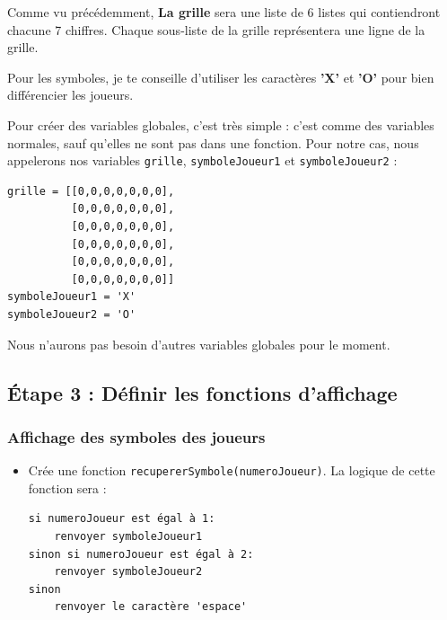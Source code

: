 \documentclass[11pt]{article}
\begin{document}
Comme vu précédemment, \textbf{La grille} sera une liste de 6 listes qui contiendront chacune 7 chiffres. Chaque sous-liste de la grille représentera une ligne de la grille.

Pour les symboles, je te conseille d'utiliser les caractères \textbf{'X'} et \textbf{'O'} pour bien différencier les joueurs.

Pour créer des variables globales, c'est très simple : c'est comme des variables normales, sauf qu'elles ne sont pas dans une fonction. Pour notre cas, nous appelerons nos variables \texttt{grille}, \texttt{symboleJoueur1} et \texttt{symboleJoueur2} :
\begin{verbatim}
grille = [[0,0,0,0,0,0,0],
          [0,0,0,0,0,0,0],
          [0,0,0,0,0,0,0],
          [0,0,0,0,0,0,0],
          [0,0,0,0,0,0,0],
          [0,0,0,0,0,0,0]]
symboleJoueur1 = 'X'
symboleJoueur2 = 'O'
\end{verbatim}

Nous n'aurons pas besoin d'autres variables globales pour le moment.

\subsection*{Étape 3 : Définir les fonctions d'affichage}
\label{puissance4_etape3}
\subsubsection*{Affichage des symboles des joueurs}
\label{sec:orgea09501}
\begin{itemize}
\item Crée une fonction \texttt{recupererSymbole(numeroJoueur)}. La logique de cette fonction sera :
\begin{verbatim}
si numeroJoueur est égal à 1:
    renvoyer symboleJoueur1
sinon si numeroJoueur est égal à 2:
    renvoyer symboleJoueur2
sinon
    renvoyer le caractère 'espace'
\end{verbatim}
\end{itemize}
\end{document}
